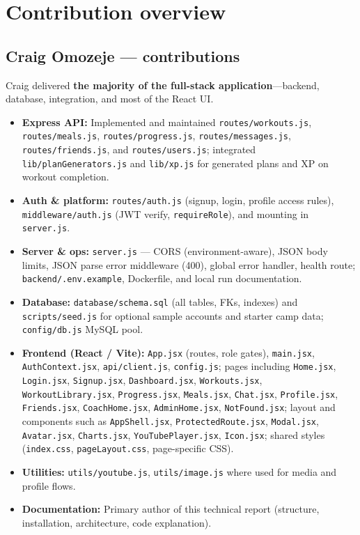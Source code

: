 \documentclass[11pt,letterpaper]{article}
\begin{document}
\section{Contribution overview}

\subsection{Craig Omozeje --- contributions}
Craig delivered \textbf{the majority of the full-stack application}---backend, database, integration, and most of the React UI.

\begin{itemize}[nosep]
  \item \textbf{Express API:} Implemented and maintained \texttt{routes/workouts.js}, \texttt{routes/meals.js}, \texttt{routes/progress.js}, \texttt{routes/messages.js}, \texttt{routes/friends.js}, and \texttt{routes/users.js}; integrated \texttt{lib/planGenerators.js} and \texttt{lib/xp.js} for generated plans and XP on workout completion.
  \item \textbf{Auth \& platform:} \texttt{routes/auth.js} (signup, login, profile access rules), \texttt{middleware/auth.js} (JWT verify, \texttt{requireRole}), and mounting in \texttt{server.js}.
  \item \textbf{Server \& ops:} \texttt{server.js} --- CORS (environment-aware), JSON body limits, JSON parse error middleware (400), global error handler, health route; \texttt{backend/.env.example}, Dockerfile, and local run documentation.
  \item \textbf{Database:} \texttt{database/schema.sql} (all tables, FKs, indexes) and \texttt{scripts/seed.js} for optional sample accounts and starter camp data; \texttt{config/db.js} MySQL pool.
  \item \textbf{Frontend (React / Vite):} \texttt{App.jsx} (routes, role gates), \texttt{main.jsx}, \texttt{AuthContext.jsx}, \texttt{api/client.js}, \texttt{config.js}; pages including \texttt{Home.jsx}, \texttt{Login.jsx}, \texttt{Signup.jsx}, \texttt{Dashboard.jsx}, \texttt{Workouts.jsx}, \texttt{WorkoutLibrary.jsx}, \texttt{Progress.jsx}, \texttt{Meals.jsx}, \texttt{Chat.jsx}, \texttt{Profile.jsx}, \texttt{Friends.jsx}, \texttt{CoachHome.jsx}, \texttt{AdminHome.jsx}, \texttt{NotFound.jsx}; layout and components such as \texttt{AppShell.jsx}, \texttt{ProtectedRoute.jsx}, \texttt{Modal.jsx}, \texttt{Avatar.jsx}, \texttt{Charts.jsx}, \texttt{YouTubePlayer.jsx}, \texttt{Icon.jsx}; shared styles (\texttt{index.css}, \texttt{pageLayout.css}, page-specific CSS).
  \item \textbf{Utilities:} \texttt{utils/youtube.js}, \texttt{utils/image.js} where used for media and profile flows.
  \item \textbf{Documentation:} Primary author of this technical report (structure, installation, architecture, code explanation).
\end{itemize}
\end{document}
